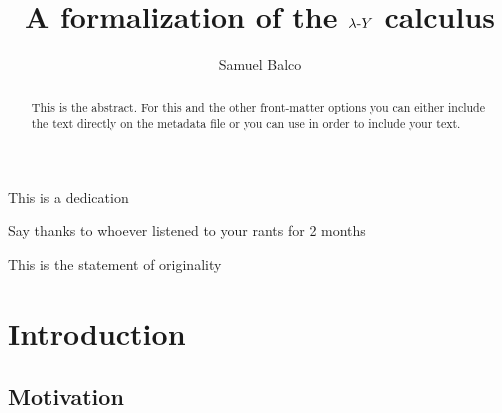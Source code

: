 \documentclass[a4paper, 12pt, twoside]{style/ociamthesis}
\title{A formalization of the \(\lambda\text{-}Y\) calculus}            %
\author{Samuel Balco}          %
\theoremstyle{plain}
\theoremstyle{definition}
\theoremstyle{remark}
\begin{document}
\maketitle

\begin{dedication}
This is a dedication
\end{dedication}

\begin{acknowledgements}
Say thanks to whoever listened to your rants for 2 months
\end{acknowledgements}


\begin{originality}
This is the statement of originality
\end{originality}


\begin{abstract}
This is the abstract. For this and the other front-matter options you
can either include the text directly on the metadata file or you can use
in order to include your text.
\end{abstract}



 \hypersetup{linkcolor=black} 
\setcounter{page}{1}
\setcounter{tocdepth}{2}
\tableofcontents 
\newpage

 \hypersetup{linkcolor=cyan} 

\chapter{Introduction}\label{introduction}

\section{Motivation}\label{motivation}
\end{document}
